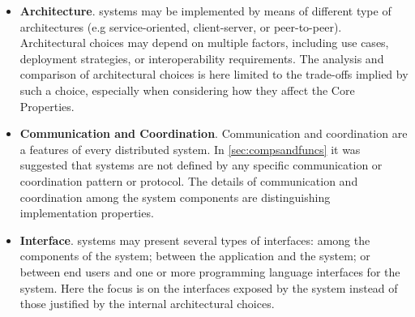 \documentclass{sig-alternate}
\begin{document}
\begin{itemize}

\item \textbf{Architecture}. \pilot systems may be implemented by means of
  different type of architectures (e.g service-oriented, client-server, or
  peer-to-peer). Architectural choices may depend on multiple factors,
  including use cases, deployment strategies, or interoperability requirements.
  The analysis and comparison of architectural choices is here limited to the
  trade-offs implied by such a choice, especially when considering how they
  affect the Core Properties.




\item \textbf{Communication and Coordination}. Communication and coordination
  are a features of every distributed system. In \ref{sec:compsandfuncs} it was
  suggested that \pilot systems are not defined by any specific communication
  or coordination pattern or protocol. The details of communication and
  coordination among the \pilot system components are distinguishing
  implementation properties.

\item \textbf{Interface}. \pilot systems may present several types of
  interfaces: among the components of the \pilot system; between the
  application and the \pilot system; or between end users and one or more
  programming language interfaces for the \pilot system. Here the focus is on
  the interfaces exposed by the \pilot system instead of those justified by the
  internal architectural choices.


\end{itemize}
\end{document}
